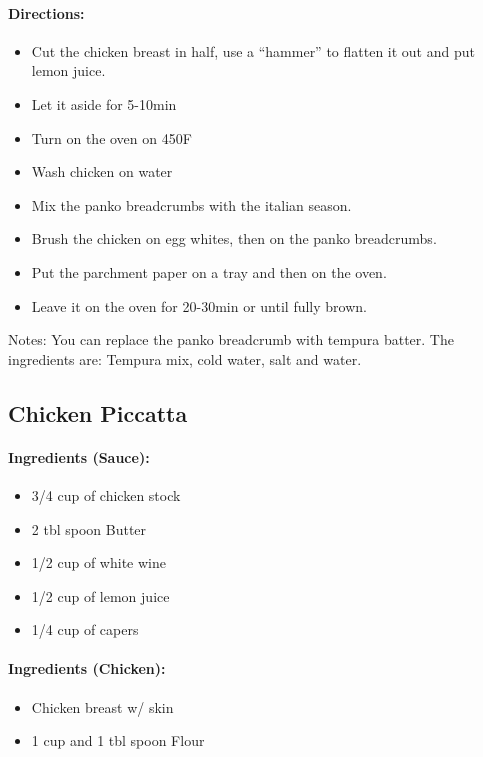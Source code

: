 \documentclass{article}
\begin{document}
\paragraph{Directions:}
\begin{itemize}
	\item Cut the chicken breast in half, use a “hammer” to flatten it out and put lemon juice.
	\item Let it aside for 5-10min
	\item Turn on the oven on 450F
	\item Wash chicken on water
	\item Mix the panko breadcrumbs with the italian season.
	\item Brush the chicken on egg whites, then on the panko breadcrumbs.
	\item Put the parchment paper on a tray and then on the oven.
	\item Leave it on the oven for 20-30min or until fully brown.
\end{itemize}

Notes: You can replace the panko breadcrumb with tempura batter. The ingredients are: Tempura mix, cold water, salt and water.


\subsection{Chicken Piccatta}

\paragraph{Ingredients (Sauce):}
\begin{itemize}
	\item 3/4 cup of chicken stock
	\item 2 tbl spoon Butter
	\item 1/2 cup of white wine
	\item 1/2 cup of lemon juice
	\item 1/4 cup of capers
\end{itemize}

\paragraph{Ingredients (Chicken):}
\begin{itemize}
	\item Chicken breast w/ skin
	\item 1 cup and 1 tbl spoon Flour
\end{itemize}
\end{document}
